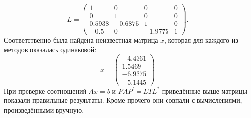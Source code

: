 \documentclass[a4paper, 12pt]{article}   	%
\begin{document}
\begin{equation*}
    L = 
    \left(\begin{array}{cccc} 
    1 & 0 & 0 & 0 \\ 
    0 & 1 & 0 & 0 \\ 
    0.5938 & -0.6875 & 1 & 0 \\ 
    -0.5 & 0 & -1.9775 & 1
    \end{array}\right).
\end{equation*}
Соответственно была найдена неизвестная матрица $x$, которая для каждого из методов оказалась одинаковой:
\begin{equation*}
    x = 
    \left(\begin{array}{c}
    -4.4361 \\
    1.5469 \\
    -6.9375 \\
    -5.1445
     \end{array}\right)
\end{equation*}
При проверке соотношений $Ax=b$ и $PAP^t = LTL^*$ приведённые выше матрицы показали правильные результаты. Кроме прочего они совпали с вычислениями, произведёнными вручную.
\end{document}
